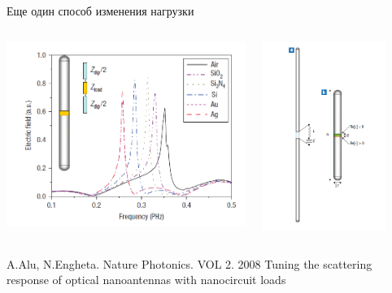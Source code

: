 \documentclass[9pt, compress, xcolor=table]{beamer}
\begin{document}
\begin{frame}{Еще один способ изменения нагрузки}
\begin{columns}[c]
\column{7cm}
\begin{center}
\includegraphics[width=1\textwidth]{optant78}
\end{center}
\column{5.5cm}
\begin{center}
\includegraphics[width=0.8\textwidth]{optant79}
\end{center}
\end{columns}

A.Alu, N.Engheta. Nature Photonics. VOL 2. 2008 
Tuning the scattering response of optical
nanoantennas with nanocircuit loads

\end{frame}
\end{document}
